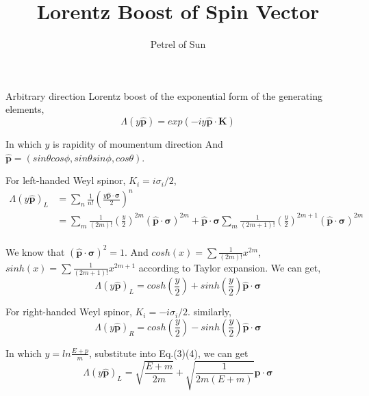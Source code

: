\documentclass[a4paper]{article}
\title{\textbf{Lorentz Boost of Spin Vector}}
\author{Petrel of Sun}
\date{}
\begin{document}
\maketitle
\par Arbitrary direction Lorentz boost of the exponential form of the generating elements,
\begin{equation}
    \Lambda(y\hat{\boldsymbol{p}})=exp(-iy\hat{\boldsymbol{p}}\cdot\boldsymbol{K})
\end{equation}
\par In which $y$ is rapidity of moumentum direction And $\hat{\boldsymbol{p}}=(sin\theta cos\phi, sin\theta sin\phi, cos\theta)$.
\par For left-handed Weyl spinor, $K_{i}=i\sigma_{i}/2$, 
\begin{equation}
    \begin{split}
            \Lambda(y\hat{\boldsymbol{p}})_{L}
            &=\sum_{n}{\frac{1}{n!}(\frac{y\hat{\boldsymbol{p}}\cdot \boldsymbol{\sigma}}{2})^n}\\
            &=\sum_{m}{\frac{1}{(2m)!}(\frac{y}{2})^{2m}(\hat{\boldsymbol{p}}\cdot \boldsymbol{\sigma})^{2m}}
            +\hat{\boldsymbol{p}}\cdot \boldsymbol{\sigma}\sum_{m}{\frac{1}{(2m+1)!}(\frac{y}{2})^{2m+1}(\hat{\boldsymbol{p}}\cdot \boldsymbol{\sigma})^{2m}}\\
    \end{split}
\end{equation}
\par We know that $(\hat{\boldsymbol{p}}\cdot \boldsymbol{\sigma})^2=1$. And $cosh(x)=\sum{\frac{1}{(2m)!}x^{2m}}$, $sinh(x)=\sum{\frac{1}{(2m+1)!}x^{2m+1}}$ according to Taylor expansion. We can get,
\begin{equation}
    \Lambda(y\hat{\boldsymbol{p}})_{L}=cosh(\frac{y}{2})+sinh(\frac{y}{2})\hat{\boldsymbol{p}}\cdot \boldsymbol{\sigma}
\end{equation}
\par For right-handed Weyl spinor, $K_{i}=-i\sigma_{i}/2$. similarly,
\begin{equation}
    \Lambda(y\hat{\boldsymbol{p}})_{R}=cosh(\frac{y}{2})-sinh(\frac{y}{2})\hat{\boldsymbol{p}}\cdot \boldsymbol{\sigma}
\end{equation}
\par In which $y=ln\frac{E+p}{m}$, substitute into Eq.(3)(4), we can get
\begin{equation}
    \Lambda(y\hat{\boldsymbol{p}})_{L}=\sqrt{\frac{E+m}{2m}}+\sqrt{\frac{1}{2m(E+m)}}\boldsymbol{p}\cdot\boldsymbol{\sigma}
\end{equation}
\end{document}
